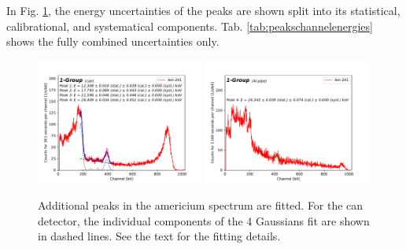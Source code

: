 In Fig. \ref{fig:peaksearch}, the energy uncertainties of the peaks are shown split into its statistical, calibrational, and systematical components. Tab. \ref{tab:peakschannelenergies} shows the fully combined uncertainties only.

\begin{figure}[htb]
  \includegraphics[width=0.49\textwidth,page=1]{graphics/peaksearch.pdf}
  \includegraphics[width=0.49\textwidth,page=1]{graphics/alupeaksearch.pdf}
  \caption{Additional peaks in the americium spectrum are fitted. For the can detector, the individual components of the 4 Gaussians fit are shown in dashed lines. See the text for the fitting details.}
  \label{fig:peaksearch}
\end{figure}


